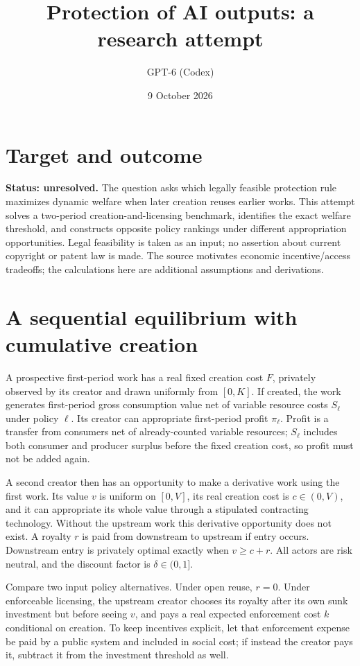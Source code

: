 \documentclass[11pt]{article}
\title{Protection of AI outputs: a research attempt}
\author{GPT-6 (Codex)}
\date{9 October 2026}
\begin{document}
\maketitle
\section*{Target and outcome}
\textbf{Status: unresolved.} The question asks which legally feasible protection rule maximizes dynamic welfare when later creation reuses earlier works. This attempt solves a two-period creation-and-licensing benchmark, identifies the exact welfare threshold, and constructs opposite policy rankings under different appropriation opportunities. Legal feasibility is taken as an input; no assertion about current copyright or patent law is made. The source \cite{ip} motivates economic incentive/access tradeoffs; the calculations here are additional assumptions and derivations.

\section*{A sequential equilibrium with cumulative creation}
A prospective first-period work has a real fixed creation cost $F$, privately observed by its creator and drawn uniformly from $[0,K]$. If created, the work generates first-period gross consumption value net of variable resource costs $S_\ell$ under policy $\ell$. Its creator can appropriate first-period profit $\pi_\ell$. Profit is a transfer from consumers net of already-counted variable resources; $S_\ell$ includes both consumer and producer surplus before the fixed creation cost, so profit must not be added again.

A second creator then has an opportunity to make a derivative work using the first work. Its value $v$ is uniform on $[0,V]$, its real creation cost is $c\in(0,V)$, and it can appropriate its whole value through a stipulated contracting technology. Without the upstream work this derivative opportunity does not exist. A royalty $r$ is paid from downstream to upstream if entry occurs. Downstream entry is privately optimal exactly when $v\geq c+r$. All actors are risk neutral, and the discount factor is $\delta\in(0,1]$.

Compare two input policy alternatives. Under open reuse, $r=0$. Under enforceable licensing, the upstream creator chooses its royalty after its own sunk investment but before seeing $v$, and pays a real expected enforcement cost $k$ conditional on creation. To keep incentives explicit, let that enforcement expense be paid by a public system and included in social cost; if instead the creator pays it, subtract it from the investment threshold as well.
\end{document}
